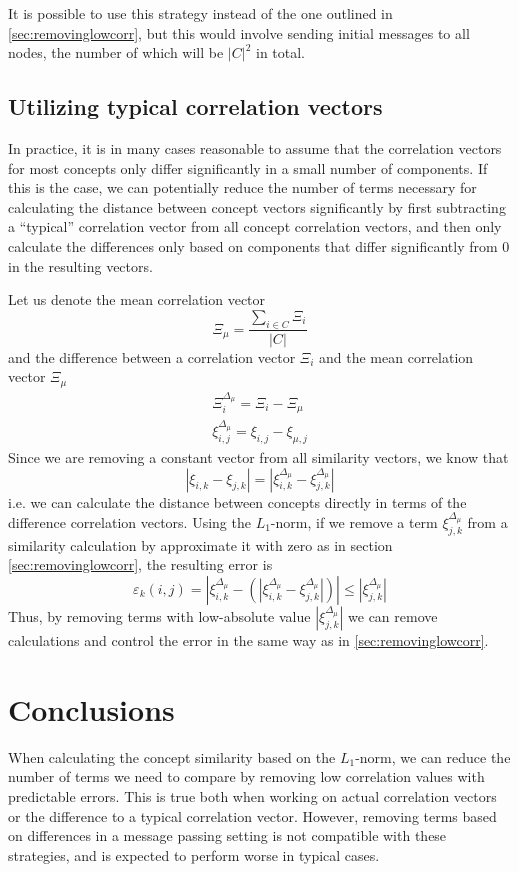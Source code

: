 \documentclass[conference]{IEEEtran}
\begin{document}
It is possible to use this strategy instead of the one outlined in \ref{sec:removinglowcorr}, but this would involve sending initial messages to all nodes, the number of which will be $|C|^2$ in total.

\subsection{Utilizing typical correlation vectors}

In practice, it is in many cases reasonable to assume that the correlation vectors for most concepts only differ significantly in a small number of components. If this is the case, we can potentially reduce the number of terms necessary for calculating the distance between concept vectors significantly by first subtracting a ``typical'' correlation vector from all concept correlation vectors, and then only calculate the differences only based on components that differ significantly from 0 in the resulting vectors.

Let us denote the mean correlation vector
\begin{equation}
\Xi_\mu = \frac{\sum_{i \in C} \Xi_i}{|C|}
\end{equation}
and the difference between a correlation vector $\Xi_i$ and the mean correlation vector $\Xi_\mu$
\begin{eqnarray}
\Xi_i^{\Delta_\mu} = \Xi_i - \Xi_\mu \nonumber \\ 
\xi_{i, j}^{\Delta_\mu} = \xi_{i, j} - \xi_{\mu, j}
\end{eqnarray}
Since we are removing a constant vector from all similarity vectors, we know that
\begin{equation}
| \xi_{i,k} - \xi_{j,k} | = | \xi_{i, k}^{\Delta_\mu} - \xi_{j, k}^{\Delta_\mu} |
\end{equation}
i.e. we can calculate the distance between concepts directly in terms of the difference correlation vectors. Using the $L_1$-norm, if we remove a term $\xi_{j,k}^{\Delta_\mu}$ from a similarity calculation by approximate it with zero as in section \ref{sec:removinglowcorr}, the resulting error is
\begin{equation}
\varepsilon_k(i, j) = | \xi_{i,k}^{\Delta_\mu} - (| \xi_{i,k}^{\Delta_\mu} - \xi_{j,k}^{\Delta_\mu} | ) |
\leq | \xi_{j,k}^{\Delta_\mu}|
\end{equation}
Thus, by removing terms with low-absolute value $|\xi_{j,k}^{\Delta_\mu}|$ we can remove calculations and control the error in the same way as in \ref{sec:removinglowcorr}.

\section{Conclusions}

When calculating the concept similarity based on the $L_1$-norm, we can reduce the number of terms we need to compare by removing low correlation values with predictable errors. This is true both when working on actual correlation vectors or the difference to a typical correlation vector. However, removing terms based on differences in a message passing setting is not compatible with these strategies, and is expected to perform worse in typical cases.
\end{document}
